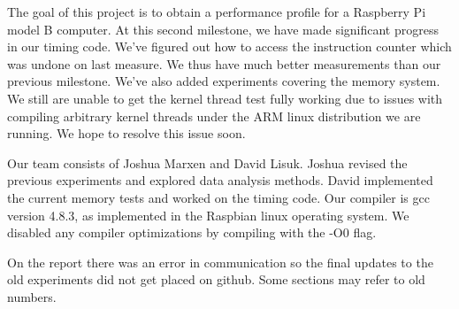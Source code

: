 The goal of this project is to obtain a performance profile for a Raspberry Pi model B computer. At this second milestone, we have made significant progress in our timing code.  We've figured out how to access the instruction counter which was undone on last measure.  We thus have much better measurements than our previous milestone.  We've also added experiments covering the memory system.  We still are unable to get the kernel thread test fully working due to issues with compiling arbitrary kernel threads under the ARM linux distribution we are running.  We hope to resolve this issue soon.

Our team consists of Joshua Marxen and David Lisuk. Joshua revised the previous experiments and explored data analysis methods.  David implemented the current memory tests and worked on the timing code. Our compiler is gcc version 4.8.3, as implemented in the Raspbian linux operating system. We disabled any compiler optimizations by compiling with the -O0 flag.

On the report there was an error in communication so the final updates to the old experiments did not get placed on github.  Some sections may refer to old numbers.